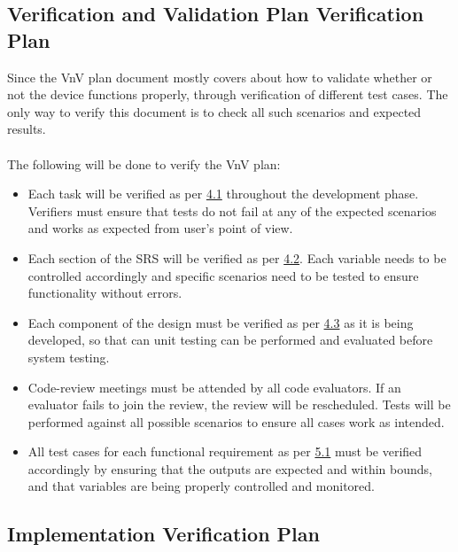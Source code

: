 \documentclass[12pt, titlepage]{article}
\begin{document}
\subsection{Verification and Validation Plan Verification Plan}

Since the VnV plan document mostly covers about how to validate whether or not the device functions properly, through verification of different test cases. The only way to verify this document is to check all such scenarios and expected results.\\
\\The following will be done to verify the VnV plan:\\
\begin{itemize}
  \item[\ding{111}] Each task will be verified as per \hyperref[4_1]{4.1} throughout the development phase. Verifiers must ensure that tests do not fail at any of the expected scenarios and works as expected from user's point of view.
  \item[\ding{111}] Each section of the SRS will be verified as per \hyperref[SRS_verification]{4.2}. Each variable needs to be controlled accordingly and specific scenarios need to be tested to ensure functionality without errors.
  \item[\ding{111}] Each component of the design must be verified as per \hyperref[sec_4_3]{4.3} as it is being developed, so that can unit testing can be performed and evaluated before system testing.
  \item[\ding{111}] Code-review meetings must be attended by all code evaluators. If an evaluator fails to join the review, the review will be rescheduled. Tests will be performed against all possible scenarios to ensure all cases work as intended.
  \item[\ding{111}] All test cases for each functional requirement as per \hyperref[sec_5_1]{5.1} must be verified accordingly by ensuring that the outputs are expected and within bounds, and that variables are being properly controlled and monitored.
\end{itemize}

\subsection{Implementation Verification Plan}
\end{document}
